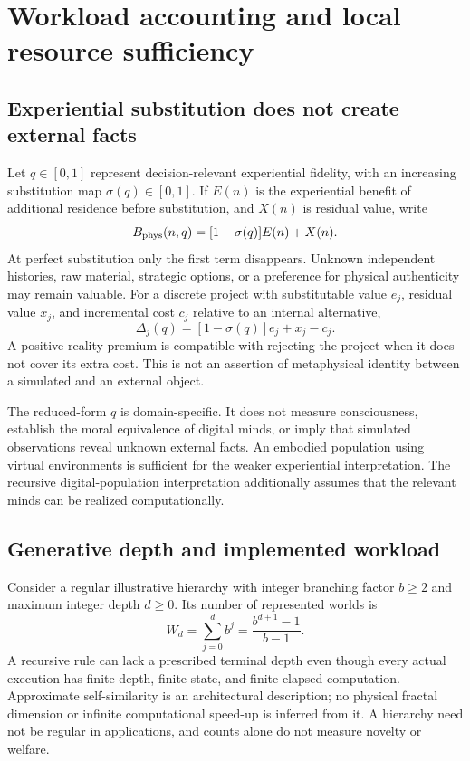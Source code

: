 \section{Workload accounting and local resource sufficiency}
\label{sec:support}

\subsection{Experiential substitution does not create external facts}

Let $q\in[0,1]$ represent decision-relevant experiential fidelity, with an increasing substitution map $\sigma(q)\in[0,1]$. If $E(n)$ is the experiential benefit of additional residence before substitution, and $X(n)$ is residual value, write
\begin{equation}
 B_{\rm phys}(n,q)=[1-\sigma(q)]E(n)+X(n).
 \label{eq:experiential}
\end{equation}
At perfect substitution only the first term disappears. Unknown independent histories, raw material, strategic options, or a preference for physical authenticity may remain valuable. For a discrete project with substitutable value $e_j$, residual value $x_j$, and incremental cost $c_j$ relative to an internal alternative,
\begin{equation}
 \Delta_j(q)=[1-\sigma(q)]e_j+x_j-c_j.
 \label{eq:premium}
\end{equation}
A positive reality premium is compatible with rejecting the project when it does not cover its extra cost. This is not an assertion of metaphysical identity between a simulated and an external object.

The reduced-form $q$ is domain-specific. It does not measure consciousness, establish the moral equivalence of digital minds, or imply that simulated observations reveal unknown external facts. An embodied population using virtual environments is sufficient for the weaker experiential interpretation. The recursive digital-population interpretation additionally assumes that the relevant minds can be realized computationally.

\subsection{Generative depth and implemented workload}

Consider a regular illustrative hierarchy with integer branching factor $b\geq2$ and maximum integer depth $d\geq0$. Its number of represented worlds is
\begin{equation}
 W_d=\sum_{j=0}^{d}b^j=\frac{b^{d+1}-1}{b-1}.
 \label{eq:worlds}
\end{equation}
A recursive rule can lack a prescribed terminal depth even though every actual execution has finite depth, finite state, and finite elapsed computation. Approximate self-similarity is an architectural description; no physical fractal dimension or infinite computational speed-up is inferred from it. A hierarchy need not be regular in applications, and counts alone do not measure novelty or welfare.


